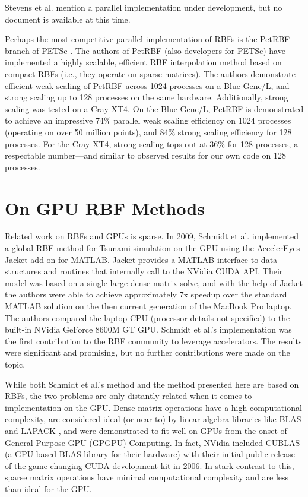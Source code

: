 \documentclass[11pt]{report}
\begin{document}
{Stevens et al. \cite{Stevens2009a} mention a parallel implementation under development, but no document is available at this time. 

Perhaps the most competitive parallel implementation of RBFs is the PetRBF \cite{Yokota2010} branch of PETSc \cite{PETSc}. The authors of PetRBF (also developers for PETSc) have implemented a highly scalable, efficient RBF interpolation method based on compact RBFs (i.e., they operate on sparse matrices). The authors demonstrate efficient weak scaling of PetRBF across 1024 processes on a Blue Gene/L, and strong scaling up to 128 processes on the same hardware. Additionally, strong scaling was tested on a Cray XT4. On the Blue Gene/L, PetRBF is demonstrated to achieve an impressive 74\% parallel weak scaling efficiency on 1024 processes (operating on over 50 million points), and 84\% strong scaling efficiency for 128 processes. For the Cray XT4, strong scaling tops out at 36\% for 128 processes, a respectable number---and similar to observed results for our own code on 128 processes.  


\section{On GPU RBF Methods}
Related work on RBFs and GPUs is sparse. In 2009, Schmidt et al. \cite{Schmidt2009a, Schmidt2009b} implemented a global RBF method for Tsunami simulation on the GPU using the AccelerEyes Jacket \cite{JacketGuide2009} add-on for MATLAB. Jacket provides a MATLAB interface to data structures and routines that internally call to the NVidia CUDA API. Their model was based on a single large dense matrix solve, and with the help of Jacket the authors were able to achieve approximately 7x speedup over the standard MATLAB solution on the then current generation of the MacBook Pro laptop. The authors compared the laptop CPU (processor details not specified) to the built-in NVidia GeForce 8600M GT GPU. Schmidt et al.'s implementation was the first contribution to the RBF community to leverage accelerators. The results were significant and promising, but no further contributions were made on the topic. 

While both Schmidt et al.'s method and the method presented here are based on RBFs, the two problems are only distantly related when it comes to implementation on the GPU. Dense matrix operations have a high computational complexity, are considered ideal (or near to) by linear algebra libraries like BLAS \cite{BLAS} and LAPACK \cite{Lapack1999}, and were demonstrated to fit well on GPUs from the onset of General Purpose GPU (GPGPU) Computing. In fact, NVidia included CUBLAS \cite{CUBLAS} (a GPU based BLAS library for their hardware) with their initial public release of the game-changing CUDA development kit in 2006. In stark contrast to this, sparse matrix operations have minimal computational complexity and are less than ideal for the GPU.


}
\end{document}
